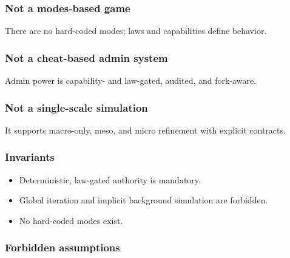\documentclass[9pt,a4paper,openany]{book}
\begin{document}
\subsubsection{Not a modes-based game}


There are no hard-\allowbreak{}coded modes; laws and capabilities define behavior.\allowbreak{}






\subsubsection{Not a cheat-based admin system}


Admin power is capability-\allowbreak{} and law-\allowbreak{}gated, audited, and fork-\allowbreak{}aware.\allowbreak{}






\subsubsection{Not a single-scale simulation}


It supports macro-\allowbreak{}only, meso, and micro refinement with explicit contracts.\allowbreak{}






\subsubsection{Invariants}


\begin{itemize}
\item Deterministic, law-\allowbreak{}gated authority is mandatory.\allowbreak{}
\end{itemize}


\begin{itemize}
\item Global iteration and implicit background simulation are forbidden.\allowbreak{}
\end{itemize}


\begin{itemize}
\item No hard-\allowbreak{}coded modes exist.\allowbreak{}
\end{itemize}





\subsubsection{Forbidden assumptions}
\end{document}
